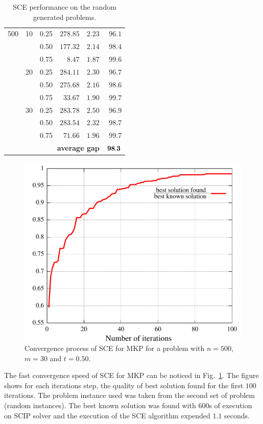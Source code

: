\begin{table}
{\begin{center}
\begin{tabular}[c]{|r|r|r|rrr|}
500 & 10 & 0.25 & $278.85$ & $  2.23$  & $96.1$ \\
    &    & 0.50 & $177.32$ & $  2.14$  & $98.4$ \\
    &    & 0.75 & $  8.47$ & $  1.87$  & $99.6$ \\ \cline{2-6}
    & 20 & 0.25 & $284.11$ & $  2.30$  & $96.7$ \\
    &    & 0.50 & $275.68$ & $  2.16$  & $98.6$ \\
    &    & 0.75 & $ 33.67$ & $  1.90$  & $99.7$ \\ \cline{2-6}
    & 30 & 0.25 & $283.78$ & $  2.50$  & $96.9$ \\
    &    & 0.50 & $283.54$ & $  2.32$  & $98.7$ \\
    &    & 0.75 & $ 71.66$ & $  1.96$  & $99.7$ \\ \cline{2-6}
    & \multicolumn{4}{r}{\textbf{average gap}}  & $\bf 98.3$  \\ \hline
\end{tabular}
\end{center}
}
 \caption{SCE performance on the random generated problems.}
 \label{tab:rand}
\end{table}

\begin{figure}
  \includegraphics[scale=0.5]{imgs/iter}
  \caption{Convergence process of SCE for MKP
    for a problem with $n=500$, $m=30$ and $t=0.50$.}
  \label{fig:iter}
\end{figure}

The fast convergence speed of SCE for MKP can be noticed in Fig.~\ref{fig:iter}.
The figure shows for each iterations step, the quality of best solution found
for the first $100$ iterations.
The problem instance used was taken from the second set of problem (random instances).
The best known solution was found with $600$s of execution on SCIP solver and
the execution of the SCE algorithm expended $1.1$ seconds.

